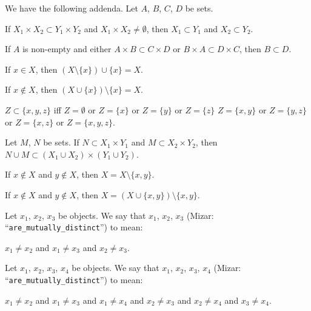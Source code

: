 \documentclass{article}
\begin{document}
We have the following addenda. Let $A$, $B$, $C$, $D$ be sets.
\begin{thm}
\item\label{zfmisc1:114} If $X_{1}\times X_{2}\subset Y_{1}\times Y_{2}$
  and $X_{1}\times X_{2}\neq\emptyset$, then $X_{1}\subset Y_{1}$ and
  $X_{2}\subset Y_{2}$.
\item\label{zfmisc1:115} If $A$ is non-empty and either $A\times B\subset C\times D$
  or $B\times A\subset D\times C$, then $B\subset D$.
\item\label{zfmisc1:116} If $x\in X$, then $(X\setminus\{x\})\cup\{x\}=X$.
\item\label{zfmisc1:117} If $x\notin X$, then $(X\cup\{x\})\setminus\{x\}=X$.
\item\label{zfmisc1:118} $Z\subset\{x,y,z\}$ iff
  $Z=\emptyset$ or
  $Z=\{x\}$ or $Z=\{y\}$ or $Z=\{z\}$
  $Z=\{x,y\}$ or $Z=\{y,z\}$ or $Z=\{x,z\}$ or
  $Z=\{x,y,z\}$.
\item\label{zfmisc1:119} Let $M$, $N$ be sets.
  If $N\subset X_{1}\times Y_{1}$ and $M\subset X_{2}\times Y_{2}$,
  then $N\cup M\subset(X_{1}\cup X_{2})\times(Y_{1}\cup Y_{2})$.
\item\label{zfmisc1:120} If $x\notin X$ and $y\notin X$, then $X=X\setminus\{x,y\}$.
\item\label{zfmisc1:121} If $x\notin X$ and $y\notin X$, then $X=(X\cup\{x,y\})\setminus\{x,y\}$.
\end{thm}

\begin{definition}
Let $x_{1}$, $x_{2}$, $x_{3}$ be objects.
We say that $x_{1}$, $x_{2}$, $x_{3}$ 
(Mizar: ``\verb#are_mutually_distinct#'') to mean:
\begin{defn}
\item $x_{1}\neq x_{2}$ and $x_{1}\neq x_{3}$ and  $x_{2}\neq x_{3}$.
\end{defn}
\end{definition}

\begin{definition}
Let $x_{1}$, $x_{2}$, $x_{3}$, $x_{4}$ be objects.
We say that $x_{1}$, $x_{2}$, $x_{3}$, $x_{4}$ 
(Mizar: ``\verb#are_mutually_distinct#'') to mean:
\begin{defn}
\item $x_{1}\neq x_{2}$ and $x_{1}\neq x_{3}$ and $x_{1}\neq x_{4}$ and
  $x_{2}\neq x_{3}$ and $x_{2}\neq x_{4}$ and $x_{3}\neq x_{4}$.
\end{defn}
\end{definition}
\end{document}
